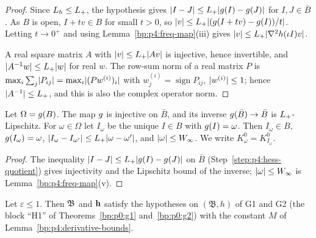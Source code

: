 \begin{proof}
\label{step:p4:hess-quotient}
Since $L_h\le L_{+}$, the hypothesis gives $\lvert I-J\rvert\le L_{+}\lvert g(I)-g(J)\rvert$ for $I,J\in\bar B$.
As $B$ is open, $I+tv\in B$ for small $t>0$, so
$\lvert v\rvert\le L_{+}\lvert (g(I+tv)-g(I))/t\rvert$. Letting $t\to0^+$ and using
Lemma~\ref{bp:p4:freq-map}(iii) gives $\lvert v\rvert\le L_{+}\lvert \nabla^2h(\iota I)v\rvert$.

\label{step:p4:hess-norm}
A real square matrix $A$ with $\lvert v\rvert\le L_{+}\lvert Av\rvert$ is injective, hence invertible, and
$\lvert A^{-1}w\rvert\le L_{+}\lvert w\rvert$ for real $w$. The row-sum norm of a real matrix $P$ is
$\max_i\sum_j\lvert P_{ij}\rvert=\max_i\lvert (Pw^{(i)})_i\rvert$ with $w^{(i)}_j=\operatorname{sign}P_{ij}$,
$\lvert w^{(i)}\rvert\le1$; hence $\lvert A^{-1}\rvert\le L_{+}$, and this is also the complex operator norm.
\end{proof}

\begin{lemma}\label{bp:p4:inverse-freq}
Let $\Omega=g(B)$. The map $g$ is injective on $\bar B$, and its inverse
$g(\bar B)\to\bar B$ is $L_{+}$-Lipschitz. For $\omega\in\Omega$ let $I_\omega$ be the unique
$I\in B$ with $g(I)=\omega$. Then $I_\omega\in B$, $g(I_\omega)=\omega$,
$\lvert I_\omega-I_{\omega'}\rvert\le L_{+}\lvert \omega-\omega'\rvert$, and $\lvert \omega\rvert\le W_\infty$. We write
$K^0_\omega=K^0_{I_\omega}$.
\end{lemma}

\begin{proof}
\label{step:p4:invfreq-proof}
The inequality $\lvert I-J\rvert\le L_{+}\lvert g(I)-g(J)\rvert$ on $\bar B$
(Step~\ref{step:p4:hess-quotient}) gives injectivity and the Lipschitz bound of the inverse;
$\lvert \omega\rvert\le W_\infty$ is Lemma~\ref{bp:p4:freq-map}(v).
\end{proof}

\begin{lemma}\label{bp:p4:h1}
Let $\varepsilon\le1$. Then $\mathfrak{B}$ and $\mathbf{h}$ satisfy the hypotheses on $(\mathfrak B,h)$ of G1
and G2 (the block ``H1'' of Theorems~\ref{bp:p0:g1} and~\ref{bp:p0:g2}) with the constant $M$ of
Lemma~\ref{bp:p4:derivative-bounds}.
\end{lemma}

